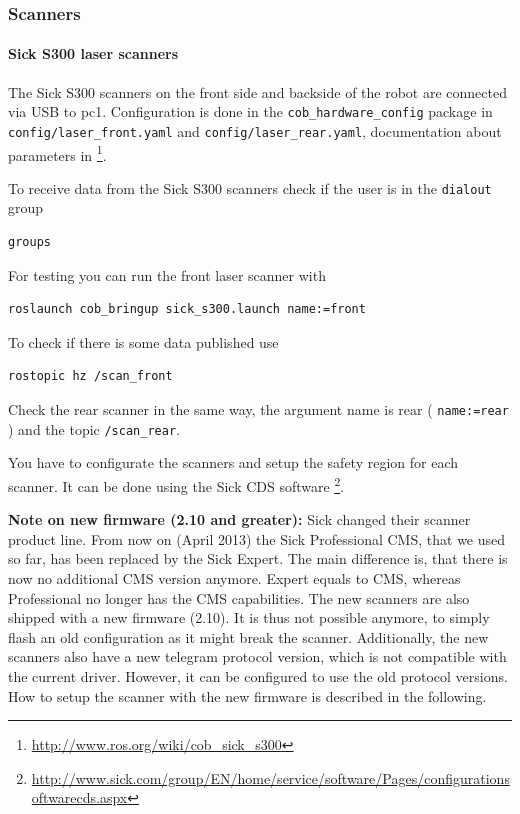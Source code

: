 \subsubsection{Scanners}

\paragraph{Sick S300 laser scanners}
The Sick S300 scanners on the front side and backside of the robot are connected via USB to pc1. Configuration is done in the \texttt{cob\_hardware\_config} package in \texttt{config/laser\_front.yaml} and \texttt{config/laser\_rear.yaml}, documentation about parameters in \footnote{\url{http://www.ros.org/wiki/cob_sick_s300}}.

To receive data from the Sick S300 scanners check if the user is in the \texttt{dialout} group
\begin{lstlisting}
groups
\end{lstlisting}

For testing you can run the front laser scanner with
\begin{lstlisting}
roslaunch cob_bringup sick_s300.launch name:=front
\end{lstlisting}

To check if there is some data published use
\begin{lstlisting}
rostopic hz /scan_front
\end{lstlisting}

Check the rear scanner in the same way, the argument name is rear ( \texttt{name:=rear} ) and the topic \texttt{/scan\_rear}.

You have to configurate the scanners and setup the safety region for each scanner. It can be done using the Sick CDS software \footnote{\url{http://www.sick.com/group/EN/home/service/software/Pages/configurationsoftwarecds.aspx}}.

\textbf{Note on new firmware (2.10 and greater):} 
Sick changed their scanner product line. From now on (April 2013) the Sick Professional CMS, that we used so far, has been replaced by the Sick Expert.
The main difference is, that there is now no additional CMS version anymore.
Expert equals to CMS, whereas Professional no longer has the CMS capabilities.
The new scanners are also shipped with a new firmware (2.10).
It is thus not possible anymore, to simply flash an old configuration as it might break the scanner.
Additionally, the new scanners also have a new telegram protocol version, which is not compatible with the current driver.
However, it can be configured to use the old protocol versions.
How to setup the scanner with the new firmware is described in the following.

